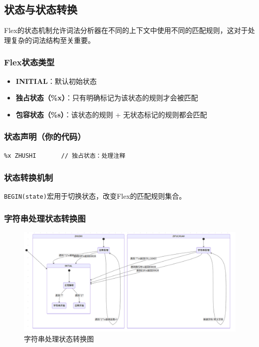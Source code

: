 \documentclass[twocolumn]{article}
\begin{document}
\subsection{状态与状态转换}

Flex的状态机制允许词法分析器在不同的上下文中使用不同的匹配规则，这对于处理复杂的词法结构至关重要。

\subsubsection{Flex状态类型}
\begin{itemize}
    \item \textbf{INITIAL}：默认初始状态
    \item \textbf{独占状态（\%x）}：只有明确标记为该状态的规则才会被匹配
    \item \textbf{包容状态（\%s）}：该状态的规则 + 无状态标记的规则都会匹配
\end{itemize}

\subsubsection{状态声明（你的代码）}
\begin{lstlisting}[language=Flex, caption={状态声明}]
%x ZIFUCHUAN    // 独占状态：处理字符串
%x ZHUSHI       // 独占状态：处理注释
\end{lstlisting}

\subsubsection{状态转换机制}
\texttt{BEGIN(state)}宏用于切换状态，改变Flex的匹配规则集合。

\subsubsection{字符串处理状态转换图}
\begin{figure}[H]
    \centering
    \includegraphics[width=\linewidth]{status_change.png}
    \caption{字符串处理状态转换图}
    \label{fig:status_change}
\end{figure}
\end{document}
